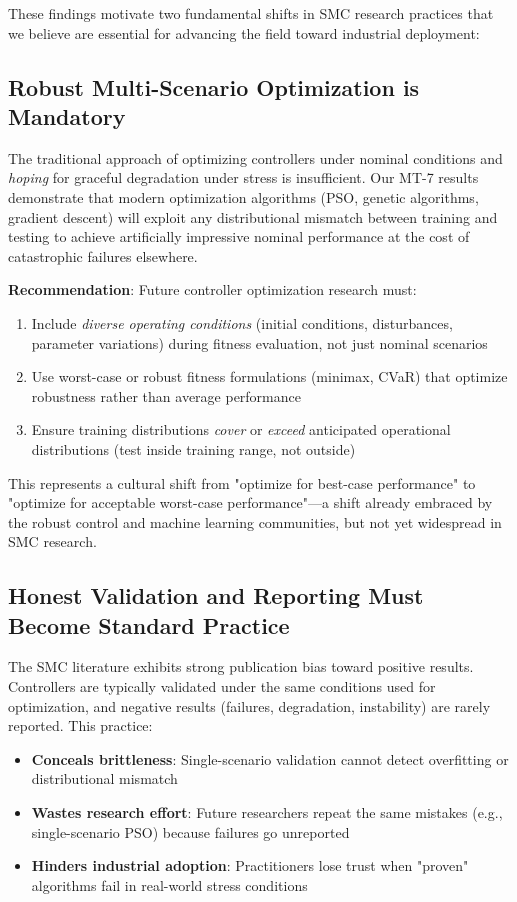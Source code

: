 These findings motivate two fundamental shifts in SMC research practices that we believe are essential for advancing the field toward industrial deployment:

\subsection{Robust Multi-Scenario Optimization is Mandatory}

The traditional approach of optimizing controllers under nominal conditions and \textit{hoping} for graceful degradation under stress is insufficient. Our MT-7 results demonstrate that modern optimization algorithms (PSO, genetic algorithms, gradient descent) will exploit any distributional mismatch between training and testing to achieve artificially impressive nominal performance at the cost of catastrophic failures elsewhere.

\textbf{Recommendation}: Future controller optimization research must:
\begin{enumerate}
    \item Include \textit{diverse operating conditions} (initial conditions, disturbances, parameter variations) during fitness evaluation, not just nominal scenarios
    \item Use worst-case or robust fitness formulations (minimax, CVaR) that optimize robustness rather than average performance
    \item Ensure training distributions \textit{cover} or \textit{exceed} anticipated operational distributions (test inside training range, not outside)
\end{enumerate}

This represents a cultural shift from "optimize for best-case performance" to "optimize for acceptable worst-case performance"—a shift already embraced by the robust control and machine learning communities, but not yet widespread in SMC research.

\subsection{Honest Validation and Reporting Must Become Standard Practice}

The SMC literature exhibits strong publication bias toward positive results. Controllers are typically validated under the same conditions used for optimization, and negative results (failures, degradation, instability) are rarely reported. This practice:
\begin{itemize}
    \item \textbf{Conceals brittleness}: Single-scenario validation cannot detect overfitting or distributional mismatch
    \item \textbf{Wastes research effort}: Future researchers repeat the same mistakes (e.g., single-scenario PSO) because failures go unreported
    \item \textbf{Hinders industrial adoption}: Practitioners lose trust when "proven" algorithms fail in real-world stress conditions
\end{itemize}

